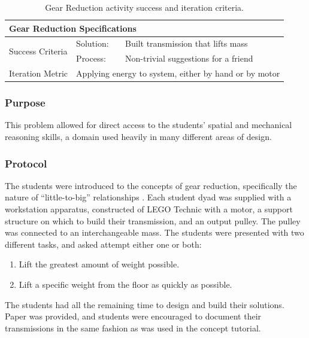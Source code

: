 	\begin{table}
	\begin{centering}
	\begin{tabular}{l  l   l}
		\multicolumn{3}{l}{{\large Gear Reduction Specifications}} \\
		\toprule
		\multirow{2}{*}{Success Criteria}  
			& Solution: 		& Built transmission that lifts mass \\ \cmidrule(r){2-3}
			& Process:		& Non-trivial suggestions for a friend \\ \midrule
		Iteration Metric	 & \multicolumn{2}{c}{Applying energy to system, either by hand or by motor}\\ 
		\bottomrule
	\end{tabular}
	\caption{Gear Reduction activity success and iteration criteria.}
	\label{tab:spec-gears}
	\end{centering}
	\end{table}
	
	\subsubsection{Purpose}
	
	This problem allowed for direct access to the students' spatial and
	mechanical reasoning skills, a domain used heavily in many different
	areas of design.
	
	
	\subsubsection{Protocol}
	
	The students were introduced to the concepts of gear reduction,
	specifically the nature of ``little-to-big'' relationships \citep{ArtofLEGO}.
	Each student dyad was supplied with a workstation apparatus, constructed
	of LEGO Technic with a motor, a support structure on which to build their
	transmission, and an output pulley. The pulley was connected to
	an interchangeable mass. The students were presented with two different
	tasks, and asked attempt either one or both:
	\begin{enumerate}
	\item Lift the greatest amount of weight possible.
	\item Lift a specific weight from the floor as quickly as possible.
	\end{enumerate}
	The students had all the remaining time to design and build
	their solutions. Paper was provided, and students were encouraged
	to document their transmissions in the same fashion as was used in
	the concept tutorial.
	
